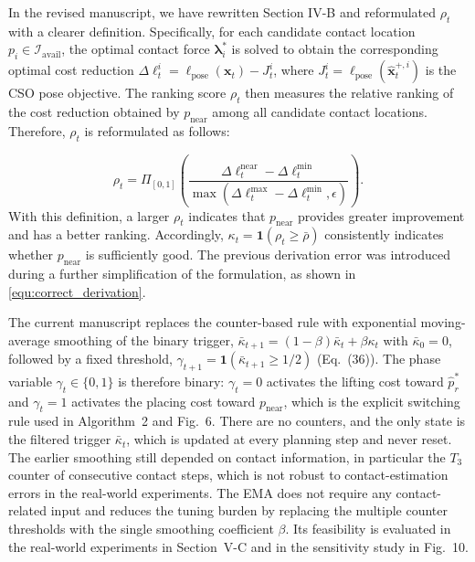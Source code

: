 \documentclass[journal,10pt]{IEEEtran}
\begin{document}
In the revised manuscript, we have rewritten Section IV-B and reformulated $\rho_t$ with a clearer definition. Specifically, for each candidate contact location $p_i \in \mathcal{I}_{\mathrm{avail}}$, the optimal contact force $\boldsymbol{\lambda}_i^*$ is solved to obtain the corresponding optimal cost reduction $\Delta\ell_t^i=\ell_{\mathrm{pose}}(\boldsymbol{x}_t)-J_t^i$, where $J_t^i=\ell_{\mathrm{pose}}(\hat{\boldsymbol{x}}_t^{+,i})$ is the CSO pose objective. The ranking score $\rho_t$ then measures the relative ranking of the cost reduction obtained by $p_{\text{near}}$ among all candidate contact locations. Therefore, $\rho_t$ is reformulated as follows:

\begin{equation}
\rho_t=
\Pi_{[0,1]}\!\left(
\frac{
\Delta\ell_t^{\mathrm{near}}
-\Delta\ell_t^{\mathrm{min}}
}{
\max(
\Delta\ell_t^{\mathrm{max}}
-\Delta\ell_t^{\mathrm{min}},\epsilon)
}
\right).
\end{equation}
With this definition, a larger $\rho_t$ indicates that $p_{\mathrm{near}}$ provides greater improvement and has a better ranking. Accordingly, $\kappa_t=\mathbf{1}(\rho_t\geq\bar{\rho})$ consistently indicates whether $p_{\text{near}}$ is sufficiently good. The previous derivation error was introduced during a further simplification of the formulation, as shown in \eqref{equ:correct_derivation}.

The current manuscript replaces the counter-based rule with exponential moving-average smoothing of the binary trigger, $\bar{\kappa}_{t+1}=(1-\beta)\bar{\kappa}_t+\beta\kappa_t$ with $\bar{\kappa}_0=0$, followed by a fixed threshold, $\gamma_{t+1}=\mathbf{1}(\bar{\kappa}_{t+1}\geq 1/2)$ (Eq.~(36)). The phase variable $\gamma_t\in\{0,1\}$ is therefore binary: $\gamma_t=0$ activates the lifting cost toward $\hat{p}_r^*$ and $\gamma_t=1$ activates the placing cost toward $p_{\mathrm{near}}$, which is the explicit switching rule used in Algorithm~2 and Fig.~6. There are no counters, and the only state is the filtered trigger $\bar{\kappa}_t$, which is updated at every planning step and never reset. The earlier smoothing still depended on contact information, in particular the $T_3$ counter of consecutive contact steps, which is not robust to contact-estimation errors in the real-world experiments. The EMA does not require any contact-related input and reduces the tuning burden by replacing the multiple counter thresholds with the single smoothing coefficient $\beta$. Its feasibility is evaluated in the real-world experiments in Section~V-C and in the sensitivity study in Fig.~10.
\end{document}
